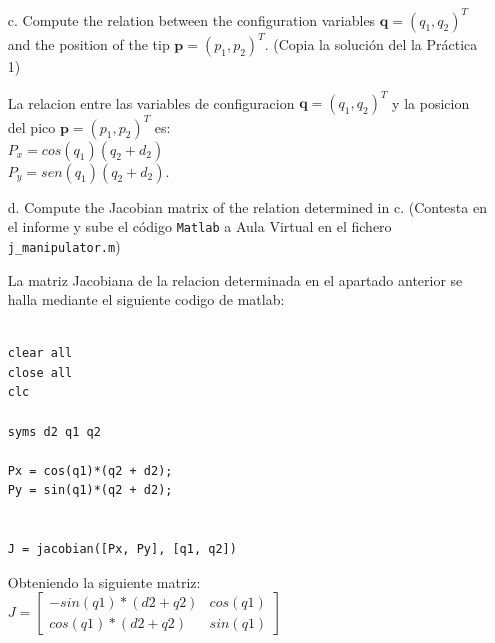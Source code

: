 \documentclass{article}
\begin{document}
\begin{itemize}
 
 
 
 
 
 
 
 
 
 
\item[c.]
{\color{gray}
Compute the relation between the configuration variables 
$\mathbf{q} =(q_1, q_2)^T$ 
and the position of the tip $\mathbf{p} = (p_1, p_2)^T$.
(Copia la soluci\'on del la Pr\'actica 1)
}

\bigskip
La relacion entre las variables de configuracion $\mathbf{q} =(q_1, q_2)^T$ y la posicion del pico $\mathbf{p} = (p_1, p_2)^T$ es:\\
$P_x = cos(q_1)(q_2+d_2)$\\
$P_y = sen(q_1)(q_2+d_2)$.
\bigskip










\item[d.]
{\color{gray}
Compute the Jacobian matrix of the relation determined in c. (Contesta en el informe y sube el c\'odigo \texttt{Matlab} a Aula Virtual en el fichero \texttt{j\_manipulator.m})
}

\bigskip
La matriz Jacobiana de la relacion determinada en el apartado anterior se halla mediante el siguiente codigo de matlab:
\bigskip


\begin{tcolorbox}
[
title={File \texttt{j\_manipulator.m}}      
]
\begin{scriptsize}
\begin{verbatim}

clear all
close all
clc

syms d2 q1 q2

Px = cos(q1)*(q2 + d2);
Py = sin(q1)*(q2 + d2);


J = jacobian([Px, Py], [q1, q2])

\end{verbatim}
\end{scriptsize}
\end{tcolorbox}

Obteniendo la siguiente matriz:\\
$J =

\begin{equation}
\begin{bmatrix}
-sin(q1)*(d2 + q2) & cos(q1)\\
cos(q1)*(d2 + q2) & sin(q1)
\end{bmatrix}
\end{equation}$








\end{itemize}
\end{document}
